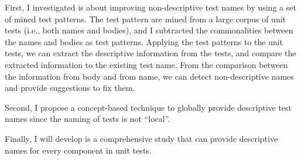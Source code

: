 \documentclass[proposal.tex]{subfiles}
\begin{document}
First, I investigated is about improving non-descriptive test names by using a set of mined test patterns.
%
The test pattern are mined from a large corpus of unit tests (i.e., both names and bodies), and I subtracted the commonalities between the names and bodies as test patterns.
%
Applying the test patterns to the unit tests, we can extract the descriptive information from the tests, and compare the extracted information to the existing test name.
%
From the comparison between the information from body and from name, we can detect non-descriptive names and provide suggestions to fix them.


Second, I propose a concept-based technique to globally provide descriptive test names since the naming of tests is not \enquote{local}.


Finally, I will develop is a comprehensive study that can provide descriptive names for every component in unit tests.
\end{document}
